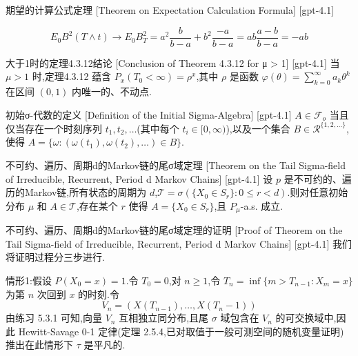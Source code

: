 \documentclass[UTF8]{ctexart}
\begin{document}
    
    
    \begin{thm}
        {期望的计算公式定理}
        [Theorem on Expectation Calculation Formula]
        [gpt-4.1]
        
\[
E_{0} B^{2}(T \wedge t) \to E_{0} B_{T}^{2} = a^{2} \frac{b}{b - a} + b^{2} \frac{-a}{b - a} = ab \frac{a - b}{b - a} = -ab
\]

    \end{thm}
    
    
    
    \begin{thm}
        {大于1时的定理4.3.12结论}
        [Conclusion of Theorem 4.3.12 for μ > 1]
        [gpt-4.1]
        当 $\mu > 1$ 时,定理4.3.12 蕴含 $P_{x}(T_{0}<\infty)=\rho^{x}$,其中 $\rho$ 是函数 $\varphi(\theta)=\sum_{k=0}^{\infty} a_{k} \theta^{k}$ 在区间 $(0,1)$ 内唯一的、不动点.
    \end{thm}
    
    
    
    \begin{dfn}
        {初始σ-代数的定义}
        [Definition of the Initial Sigma-Algebra]
        [gpt-4.1]
        $A \in \mathcal{F}_o$ 当且仅当存在一个时刻序列 $t_1, t_2, \ldots$(其中每个 $t_i \in [0, \infty)$),以及一个集合 $B \in \mathcal{R}^{\{1,2,\ldots\}}$,使得 $A = \{\omega : (\omega(t_1), \omega(t_2), \ldots) \in B\}$.
    \end{dfn}
    
    
    
    \begin{thm}
        {不可约、遍历、周期d的Markov链的尾σ域定理}
        [Theorem on the Tail Sigma-field of Irreducible, Recurrent, Period d Markov Chains]
        [gpt-4.1]
        设 $p$ 是不可约的、遍历的Markov链,所有状态的周期为 $d$,$\mathcal{T} = \sigma(\{ X_{0} \in S_{r} \} : 0 \leq r < d)$.则对任意初始分布 $\mu$ 和 $A \in \mathcal{T}$,存在某个 $r$ 使得 $A = \{ X_{0} \in S_{r} \}$,且 $P_{\mu}$-a.s. 成立.

    \end{thm}
    
    
    
    \begin{prf}
        {不可约、遍历、周期d的Markov链的尾σ域定理的证明}
        [Proof of Theorem on the Tail Sigma-field of Irreducible, Recurrent, Period d Markov Chains]
        [gpt-4.1]
        我们将证明过程分三步进行.

情形1:假设 $P(X_{0} = x) = 1$.令 $T_{0} = 0$,对 $n \geq 1$,令 $T_{n} = \inf\{ m > T_{n-1} : X_{m} = x \}$ 为第 $n$ 次回到 $x$ 的时刻.令
\[
V_{n} = (X(T_{n-1}), \ldots, X(T_{n}-1))
\]
由练习 5.3.1 可知,向量 $V_{n}$ 互相独立同分布,且尾 $\sigma$ 域包含在 $V_{n}$ 的可交换域中,因此 Hewitt-Savage 0-1 定律(定理 2.5.4,已对取值于一般可测空间的随机变量证明)推出在此情形下 $\tau$ 是平凡的.

    \end{prf}
    
\end{document}
